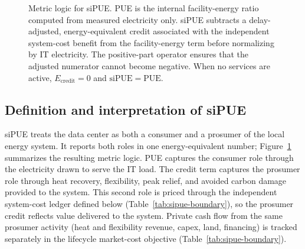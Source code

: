 \documentclass[preprint,12pt]{elsarticle}
\begin{document}
\begin{figure}[tbp]
{
}
\caption{Metric logic for siPUE. PUE is the internal facility-energy ratio computed from measured electricity only. siPUE subtracts a delay-adjusted, energy-equivalent credit associated with the independent system-cost benefit from the facility-energy term before normalizing by IT electricity. The positive-part operator ensures that the adjusted numerator cannot become negative. When no services are active, $E_{\mathrm{credit}}=0$ and $\mathrm{siPUE}=\mathrm{PUE}$.}
\label{fig:sipue-metric-story}
\end{figure}




\subsection{Definition and interpretation of siPUE}

siPUE treats the data center as both a consumer and a prosumer of the local energy system. It reports both roles in one energy-equivalent number; Figure~\ref{fig:sipue-metric-story} summarizes the resulting metric logic. PUE captures the consumer role through the electricity drawn to serve the IT load. The credit term captures the prosumer role through heat recovery, flexibility, peak relief, and avoided carbon damage provided to the system. This second role is priced through the independent system-cost ledger defined below (Table~\ref{tab:sipue-boundary}), so the prosumer credit reflects value delivered to the system. Private cash flow from the same prosumer activity (heat and flexibility revenue, capex, land, financing) is tracked separately in the lifecycle market-cost objective (Table~\ref{tab:sipue-boundary}).
\end{document}
